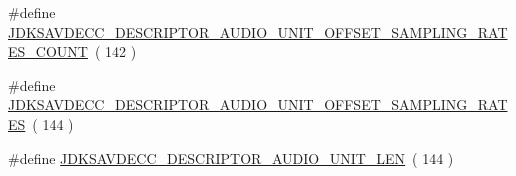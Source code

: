 \begin{DoxyCompactItemize}
\item 
\#define \hyperlink{group__descriptor__audio_ga29e510abfaf7ffb996a82cf0c77b4eb7}{J\+D\+K\+S\+A\+V\+D\+E\+C\+C\+\_\+\+D\+E\+S\+C\+R\+I\+P\+T\+O\+R\+\_\+\+A\+U\+D\+I\+O\+\_\+\+U\+N\+I\+T\+\_\+\+O\+F\+F\+S\+E\+T\+\_\+\+S\+A\+M\+P\+L\+I\+N\+G\+\_\+\+R\+A\+T\+E\+S\+\_\+\+C\+O\+U\+NT}~( 142 )
\item 
\#define \hyperlink{group__descriptor__audio_ga98a031902f5cff59b79403223fd866ac}{J\+D\+K\+S\+A\+V\+D\+E\+C\+C\+\_\+\+D\+E\+S\+C\+R\+I\+P\+T\+O\+R\+\_\+\+A\+U\+D\+I\+O\+\_\+\+U\+N\+I\+T\+\_\+\+O\+F\+F\+S\+E\+T\+\_\+\+S\+A\+M\+P\+L\+I\+N\+G\+\_\+\+R\+A\+T\+ES}~( 144 )
\item 
\#define \hyperlink{group__descriptor__audio_ga9dc3459aa940c794fe03d7a04c3319c4}{J\+D\+K\+S\+A\+V\+D\+E\+C\+C\+\_\+\+D\+E\+S\+C\+R\+I\+P\+T\+O\+R\+\_\+\+A\+U\+D\+I\+O\+\_\+\+U\+N\+I\+T\+\_\+\+L\+EN}~( 144 )
\end{DoxyCompactItemize}
